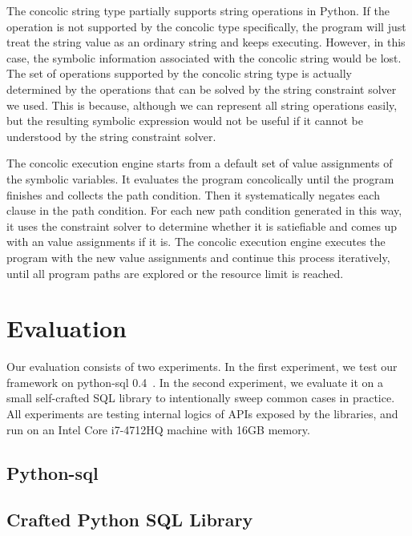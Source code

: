 \documentclass[conference]{IEEEtran}
\begin{document}
The concolic string type partially supports string operations in Python. If the operation is not supported by the concolic type specifically, the program will just treat the string value as an ordinary string and keeps executing. However, in this case, the symbolic information associated with the concolic string would be lost. The set of operations supported by the concolic string type is actually determined by the operations that can be solved by the string constraint solver we used. This is because, although we can represent all string operations easily, but the resulting symbolic expression would not be useful if it cannot be understood by the string constraint solver.

The concolic execution engine starts from a default set of value assignments of the symbolic variables. It evaluates the program concolically until the program finishes and collects the path condition. Then it systematically negates each clause in the path condition. For each new path condition generated in this way, it uses the constraint solver to determine whether it is satiefiable and comes up with an value assignments if it is. The concolic execution engine executes the program with the new value assignments and continue this process iteratively, until all program paths are explored or the resource limit is reached.


\section{Evaluation}
\label{evaluation}
Our evaluation consists of two experiments. In the first experiment, we test our framework on python-sql 0.4~\cite{python-sql}. In the second experiment, we evaluate it on a small self-crafted SQL library to intentionally sweep common cases in practice. All experiments are testing internal logics of APIs exposed by the libraries, and run on an Intel Core i7-4712HQ machine with 16GB memory.

\subsection{Python-sql}
\label{python-sql}

\subsection{Crafted Python SQL Library}
\label{crafted-sql}
\end{document}
